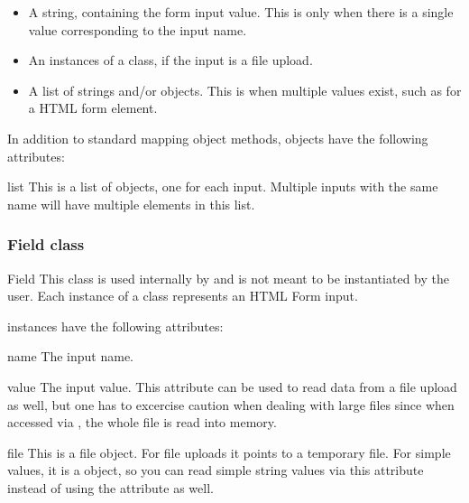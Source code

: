 \begin{itemize}
\item
A string, containing the form input value. This is only when there is a single
value corresponding to the input name.
\item
An instances of a  class, if the input is a file upload.
\item
A list of strings and/or  objects. This is when multiple values
exist, such as for a  HTML form element.
\end{itemize}

In addition to standard mapping object methods,  objects
have the following attributes:

\begin{memberdesc}{list}
This is a list of  objects, one for each input. Multiple
inputs with the same name will have multiple elements in this list.
\end{memberdesc}

\subsubsection{Field class\label{pyapi-util-fstor-fld}}

\begin{classdesc}{Field}{}
This class is used internally by  and is not
meant to be instantiated by the user. Each instance of a 
class represents an HTML Form input.
\end{classdesc}

 instances have the following attributes:

\begin{memberdesc}{name}
The input name.
\end{memberdesc}

\begin{memberdesc}{value}
The input value. This attribute can be used to read data from a file
upload as well, but one has to excercise caution when dealing with
large files since when accessed via , the whole file is
read into memory.
\end{memberdesc}

\begin{memberdesc}{file}
This is a file object. For file uploads it points to a temporary file.
For simple values, it is a  object, so you can read
simple string values via this attribute instead of using the 
attribute as well.
\end{memberdesc}


